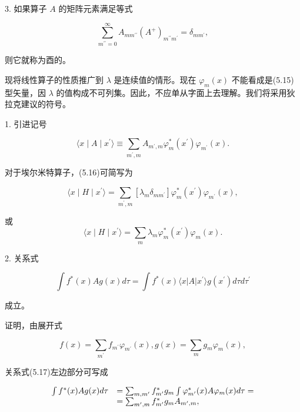 3. 如果算子 $A$ 的矩阵元素满足等式

\begin{equation*}
\sum_ {m ^ {\prime \prime} = 0} ^ {\infty} A _ {m m ^ {\prime \prime}} (A ^ {+}) _ {m ^ {\prime \prime} m ^ {\prime}} = \delta_ {m m ^ {\prime}},
\end{equation*}

则它就称为酉的。

现将线性算子的性质推广到 $\lambda$ 是连续值的情形。现在 $\varphi_{m}(x)$ 不能看成是(5.15)型矢量，因 $\lambda$ 的值构成不可列集。因此，不应单从字面上去理解。我们将采用狄拉克建议的符号。

1. 引进记号

\begin{equation*}
\langle x \mid A \mid x ^ {\prime} \rangle \equiv \sum_ {m ^ {\prime}, m} A _ {m ^ {\prime}, m} \varphi_ {m} ^ {*} (x ^ {\prime}) \varphi_ {m ^ {\prime}} (x).\tag{5.16}
\end{equation*}

对于埃尔米特算子，(5.16)可简写为

\begin{equation*}
\langle x \mid H \mid x ^ {\prime} \rangle = \sum_ {m ^ {\prime}, m} [ \lambda_ {m} \delta_ {m m ^ {\prime}} ] \varphi_ {m} ^ {*} (x ^ {\prime}) \varphi_ {m ^ {\prime}} (x),
\end{equation*}

或
\begin{equation*}
\langle x \mid H \mid x ^ {\prime} \rangle = \sum_ {m} \lambda_ {m} \varphi_ {m} ^ {*} (x ^ {\prime}) \varphi_ {m} (x).
\end{equation*}

2. 关系式

\begin{equation*}
\int f ^ {*} (x) A g (x) d \tau = \int f ^ {*} (x) \langle x | A | x ^ {\prime} \rangle g (x ^ {\prime}) d \tau d \tau^ {\prime}\tag{5.17}
\end{equation*}

成立。

证明，由展开式

\begin{equation*}
f (x) = \sum_ {m ^ {\prime}} f _ {m ^ {\prime}} \varphi_ {m ^ {\prime}} (x), g (x) = \sum_ {m} g _ {m} \varphi_ {m} (x),
\end{equation*}

关系式(5.17)左边部分可写成

\begin{equation*}
\begin{array}{r l} \int f ^ {*} (x) A g (x) d \tau & = \sum_ {m, m ^ {\prime}} f _ {m ^ {\prime}} ^ {*} g _ {m} \int \varphi_ {m ^ {\prime}} ^ {*} (x) A \varphi_ {m} (x) d \tau = \\ & = \sum_ {m ^ {\prime}, m} f _ {m ^ {\prime}} ^ {*} g _ {m} A _ {m ^ {\prime}, m}, \end{array}
\end{equation*}

